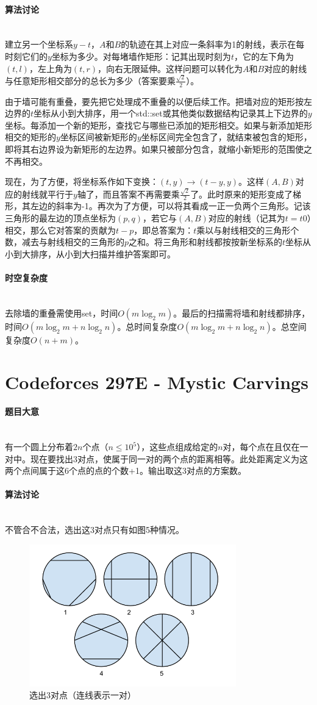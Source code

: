\documentclass[UTF8]{ctexart}
\newcommand{\myparagraph}[1]{\paragraph{#1}\mbox{}\\}
\theoremstyle{nonumberplain}
\begin{document}
		\myparagraph{算法讨论}
		
			建立另一个坐标系$y-t$，$A$和$B$的轨迹在其上对应一条斜率为1的射线，表示在每时刻它们的$y$坐标为多少。对每堵墙作矩形：记其出现时刻为$t$，它的左下角为$(t,l)$，左上角为$(t,r)$，向右无限延伸。这样问题可以转化为$A$和$B$对应的射线与任意矩形相交部分的总长为多少（答案要乘$\frac{\sqrt{2}}{2}$）。
			
			由于墙可能有重叠，要先把它处理成不重叠的以便后续工作。把墙对应的矩形按左边界的$t$坐标从小到大排序，用一个std::set或其他类似数据结构记录其上下边界的$y$坐标。每添加一个新的矩形，查找它与哪些已添加的矩形相交。如果与新添加矩形相交的矩形的$y$坐标区间被新矩形的$y$坐标区间完全包含了，就结束被包含的矩形，即将其右边界设为新矩形的左边界。如果只被部分包含，就缩小新矩形的范围使之不再相交。
			
			现在，为了方便，将坐标系作如下变换：$(t,y) \to (t-y,y)$。这样$(A,B)$对应的射线就平行于$y$轴了，而且答案不再需要乘$\frac{\sqrt{2}}{2}$了。此时原来的矩形变成了梯形，其左边的斜率为-1。再次为了方便，可以将其看成一正一负两个三角形。记该三角形的最左边的顶点坐标为$(p,q)$，若它与$(A,B)$对应的射线（记其为$t=t0$）相交，那么它对答案的贡献为$t-p$，即总答案为：$t$乘以与射线相交的三角形个数，减去与射线相交的三角形的$p$之和。将三角形和射线都按按新坐标系的$t$坐标从小到大排序，从小到大扫描并维护答案即可。
		
		\myparagraph{时空复杂度}
		
			去除墙的重叠需使用set，时间$O(m\log_2m)$。最后的扫描需将墙和射线都排序，时间$O(m\log_2m + n\log_2n)$。总时间复杂度$O(m\log_2m + n\log_2n)$。总空间复杂度$O(n+m)$。
	
	\section{Codeforces 297E - Mystic Carvings}
	
		\myparagraph{题目大意}
		
			有一个圆上分布着$2n$个点（$n \leq 10^5$），这些点组成给定的$n$对，每个点在且仅在一对中。现在要找出3对点，使属于同一对的两个点的距离相等。此处距离定义为这两个点间属于这6个点的点的个数+1。输出取这3对点的方案数。
		
		\myparagraph{算法讨论}
		
			不管合不合法，选出这3对点只有如图5种情况。
			
			\begin{figure}[ht]
				\centering
				\includegraphics[width=0.8\textwidth]{fig297e_1.png}
				\caption{选出3对点（连线表示一对）}
			\end{figure}
			
\end{document}
